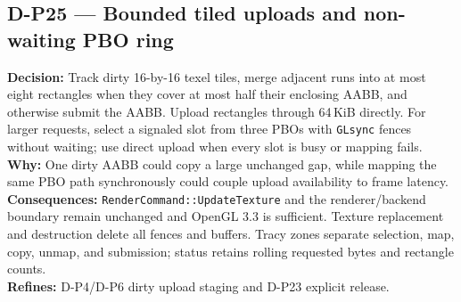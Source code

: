 \subsection*{D-P25 --- Bounded tiled uploads and non-waiting PBO ring}
\begin{decisionbox}[title={D-P25 \quad 2026-08-09}]
\textbf{Decision:} Track dirty 16-by-16 texel tiles, merge adjacent runs into at
most eight rectangles when they cover at most half their enclosing AABB, and
otherwise submit the AABB. Upload rectangles through 64\,KiB directly. For
larger requests, select a signaled slot from three PBOs with \texttt{GLsync}
fences without waiting; use direct upload when every slot is busy or mapping
fails.\\
\textbf{Why:} One dirty AABB could copy a large unchanged gap, while mapping the
same PBO path synchronously could couple upload availability to frame latency.\\
\textbf{Consequences:} \texttt{RenderCommand::UpdateTexture} and the
renderer/backend boundary remain unchanged and OpenGL 3.3 is sufficient.
Texture replacement and destruction delete all fences and buffers. Tracy zones
separate selection, map, copy, unmap, and submission; status retains rolling
requested bytes and rectangle counts.\\
\textbf{Refines:} D-P4/D-P6 dirty upload staging and D-P23 explicit release.
\end{decisionbox}

